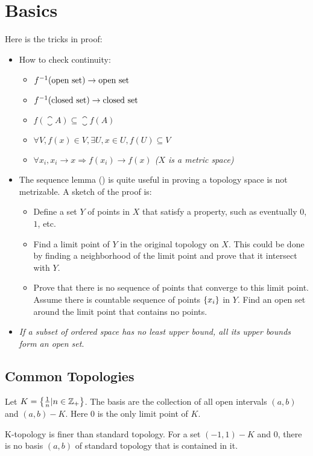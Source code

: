 \chapter{Basics}

Here is the tricks in proof:
\begin{itemize}
    \item How to check continuity:
\begin{itemize}
    \item ${f}^{-1}(\text{open set}) \rightarrow \text{open set}$
    \item ${f}^{-1}(\text{closed set}) \rightarrow \text{closed set}$
    \item $f(\closure{A}) \subseteq \closure{f(A)}$
    \item $\forall V, f(x) \in V, \exists U, x\in U, f(U) \subseteq V$
    \item \emph{$\forall x_i, x_i \rightarrow x \Rightarrow f(x_i) \rightarrow f(x)$ ($X$ is a metric space)}
\end{itemize}
    \item The sequence lemma () is quite useful in proving a topology space is not metrizable. A sketch of the proof is:
    \begin{itemize}
        \item Define a set $Y$ of points in $X$ that satisfy a property, such as eventually $0$, $1$, etc.
        \item Find a limit point of $Y$ in the original topology on $X$. This could be done by finding a neighborhood of the limit point and prove that it intersect with $Y$.
        \item Prove that there is no sequence of points that converge to this limit point. Assume there is countable sequence of points $\set{x_i}$ in $Y$. Find an open set around the limit point that contains no points.
    \end{itemize}
    \item \emph{If a subset of ordered space has no least upper bound, all its upper bounds form an open set}.
\end{itemize}








\section{Common Topologies}

\begin{definition}
    Let $K = \set{\frac{1}{n} | n \in \mathbb{Z}_{+}}$. The basis are the collection of all open intervals $(a,b)$ and $(a,b) - K$. Here $0$ is the only limit point of $K$.
    
    K-topology is finer than standard topology. For a set $(-1,1) - K$ and $0$, there is no basis $(a,b)$ of standard topology that is contained in it.
\end{definition}



